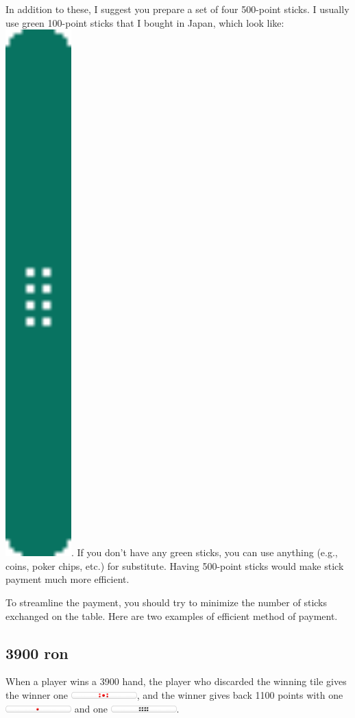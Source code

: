 \bigskip \noindent
In addition to these, I suggest you prepare a set of four 500-point sticks. I usually use green 100-point sticks that I bought in Japan, which look like: \includegraphics[width=1in]{figs/tenbou500}. If you don't have any green sticks, you can use anything (e.g., coins, poker chips, etc.) for substitute. 
Having 500-point sticks would make stick payment much more efficient.

\bigskip
To streamline the payment, you should try to minimize the number of sticks exchanged on the table. Here are two examples of efficient method of payment. 

\subsection*{3900 {\jap ron}}
When a player wins a 3900 hand, the player who discarded the winning tile gives the winner one \includegraphics[width=1in]{figs/tenbou5000}, and the winner gives  back 1100 points with one \includegraphics[width=1in]{figs/tenbou1000} and one \includegraphics[width=1in]{figs/tenbou100}. 

